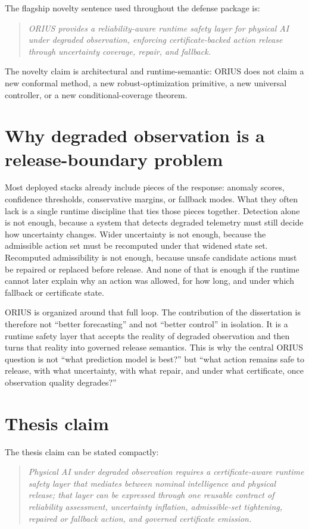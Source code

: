 The flagship novelty sentence used throughout the defense package is:
\begin{quote}
\emph{ORIUS provides a reliability-aware runtime safety layer for physical AI under degraded observation, enforcing certificate-backed action release through uncertainty coverage, repair, and fallback.}
\end{quote}
The novelty claim is architectural and runtime-semantic: ORIUS does not claim a new
conformal method, a new robust-optimization primitive, a new universal controller, or a
new conditional-coverage theorem.

\section{Why degraded observation is a release-boundary problem}
Most deployed stacks already include pieces of the response: anomaly scores, confidence
thresholds, conservative margins, or fallback modes. What they often lack is a single runtime
discipline that ties those pieces together. Detection alone is not enough, because a system that
detects degraded telemetry must still decide how uncertainty changes. Wider uncertainty is not
enough, because the admissible action set must be recomputed under that widened state set.
Recomputed admissibility is not enough, because unsafe candidate actions must be repaired or
replaced before release. And none of that is enough if the runtime cannot later explain why an
action was allowed, for how long, and under which fallback or certificate state.

ORIUS is organized around that full loop. The contribution of the dissertation is therefore not
``better forecasting'' and not ``better control'' in isolation. It is a runtime safety layer that
accepts the reality of degraded observation and then turns that reality into governed release
semantics. This is why the central ORIUS question is not ``what prediction model is best?''
but ``what action remains safe to release, with what uncertainty, with what repair, and under
what certificate, once observation quality degrades?''

\section{Thesis claim}
The thesis claim can be stated compactly:
\begin{quote}
\emph{Physical AI under degraded observation requires a certificate-aware runtime safety layer
that mediates between nominal intelligence and physical release; that layer can be expressed
through one reusable contract of reliability assessment, uncertainty inflation, admissible-set
tightening, repaired or fallback action, and governed certificate emission.}
\end{quote}

